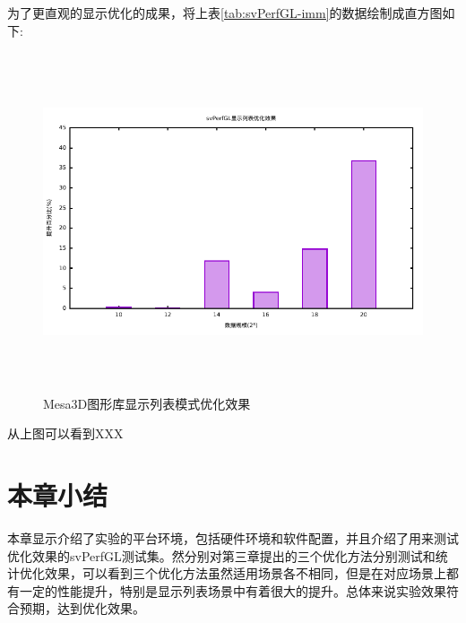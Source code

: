 为了更直观的显示优化的成果，将上表\ref{tab:svPerfGL-imm}的数据绘制成直方图如下:

\begin{figure}[H] 
  \centering
  \includegraphics[width=14cm,height=10cm]{figures/gnuplot/result/dsp.eps}
  \caption{Mesa3D图形库显示列表模式优化效果}
  \label{fig:svPerfGL-dsp}
\end{figure}

从上图可以看到XXX

\section{本章小结}

本章显示介绍了实验的平台环境，包括硬件环境和软件配置，并且介绍了用来测试优化效果的svPerfGL测试集。然分别对第三章提出的三个优化方法分别测试和统计优化效果，可以看到三个优化方法虽然适用场景各不相同，但是在对应场景上都有一定的性能提升，特别是显示列表场景中有着很大的提升。总体来说实验效果符合预期，达到优化效果。
